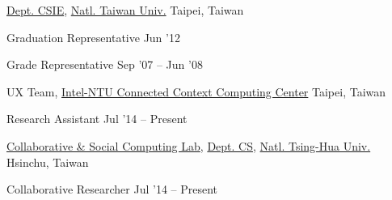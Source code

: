 \documentclass[10pt, a4paper]{article} %
\begin{document}
\spacedhrule{0.5em}{-1em} %




\headedsection %
{\href{http://www.csie.ntu.edu.tw}{Dept. CSIE}, \href{http://www.ntu.edu.tw}{Natl. Taiwan Univ.}}
{Taipei, Taiwan}
{
	\headedsubsection %
	{Graduation Representative}
	{Jun '12} 
	{}

	\headedsubsection %
	{Grade Representative}
	{Sep '07 -- Jun '08} 
	{}

}




\spacedhrule{5em}{-1em} %


\headedsection
{UX Team, \href{http://ccc.ntu.edu.tw/}{Intel-NTU Connected Context Computing Center}}
{Taipei, Taiwan}{

	\headedsubsection
	{Research Assistant}
	{Jul '14 -- Present}
	{}
}


\headedsection
{\href{http://csclab.tw/}{Collaborative \& Social Computing Lab},
 \href{http://www.cs.nthu.edu.tw}{Dept. CS},
 \href{http://www.nthu.edu.tw}{Natl. Tsing-Hua Univ.}}
{Hsinchu, Taiwan}{

	\headedsubsection
	{Collaborative Researcher}
	{Jul '14 -- Present}
	{}
}
\end{document}
